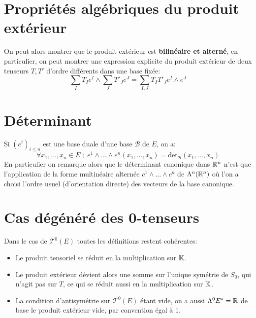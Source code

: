    \section{Propriétés algébriques du produit extérieur}
   On peut alors montrer que le produit extérieur est \textbf{bilinéaire et alterné}, en particulier, on peut montrer une expression explicite du produit extérieur de deux tenseurs \( T, T' \) d'ordre différents dans une base fixée:
   \[ 
      \sum_{I} T_{I} e^I \wedge \sum_{J} T'_{J} e^J = \sum_{I, J} T_{I}T'_{J} e^I \wedge e^J
   \]
   \pagebreak
   \section{Déterminant}
   Si \( (e^i)_{i \leq n} \) est une base duale d'une base \( \mathcal{B} \) de \( E \), on a:
   \[ 
      \forall x_1, \ldots, x_n \in E \; ; \; e^1 \wedge \ldots \wedge e^n(x_1, \ldots, x_n) = \text{det}_{\mathcal{B}}(x_1, \ldots, x_n)
   \]
   En particulier on remarque alors que le déterminant canonique dans \( \mathbb{R}^n \) n'est que l'application de la forme multinéaire alternée \( c^1 \wedge \ldots \wedge c^n \) de \( \Lambda^n(\mathbb{R}^n) \) où l'on a choisi l'ordre usuel (d'orientation directe) des vecteurs de la base canonique.
   \section{Cas dégénéré des 0-tenseurs}
   Dans le cas de \(\mathscr{T}^0(E)\) toutes les définitions restent cohérentes:
   \begin{itemize}
      \item Le produit tensoriel se réduit en la multiplication sur \( \mathbb{K} \).
      \item Le produit extérieur dévient alors une somme sur l'unique symétrie de \( S_0 \), qui n'agit pas sur \( T \), ce qui se réduit aussi en la multiplication sur \( \mathbb{K} \).
      \item La condition d'antisymétrie sur \( \mathscr{T}^0(E) \) étant vide, on a aussi \(\Lambda^0 E^* = \mathbb{R}\) de base le produit extérieur vide, par convention égal à 1.
   \end{itemize}
